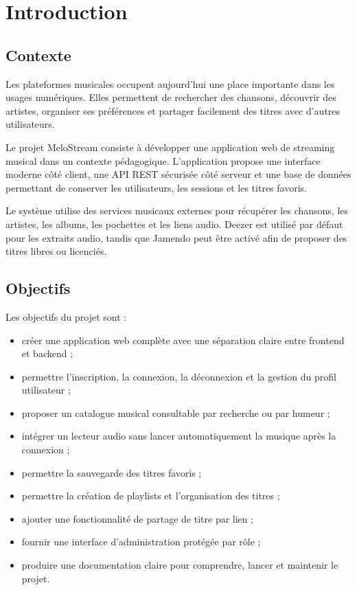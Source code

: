 \documentclass[12pt,a4paper]{report}
\newcommand{\projectName}{MeloStream}
\begin{document}

\chapter*{Introduction}

\section*{Contexte}

Les plateformes musicales occupent aujourd'hui une place importante dans les
usages numériques. Elles permettent de rechercher des chansons, découvrir des
artistes, organiser ses préférences et partager facilement des titres avec
d'autres utilisateurs.

Le projet \projectName{} consiste à développer une application web de streaming
musical dans un contexte pédagogique. L'application propose une interface
moderne côté client, une API REST sécurisée côté serveur et une base de données
permettant de conserver les utilisateurs, les sessions et les titres favoris.

Le système utilise des services musicaux externes pour récupérer les chansons,
les artistes, les albums, les pochettes et les liens audio. Deezer est utilisé
par défaut pour les extraits audio, tandis que Jamendo peut être activé afin de
proposer des titres libres ou licenciés.

\section*{Objectifs}

Les objectifs du projet sont :

\begin{itemize}
    \item créer une application web complète avec une séparation claire entre
    frontend et backend ;
    \item permettre l'inscription, la connexion, la déconnexion et la gestion
    du profil utilisateur ;
    \item proposer un catalogue musical consultable par recherche ou par
    humeur ;
    \item intégrer un lecteur audio sans lancer automatiquement la musique après
    la connexion ;
    \item permettre la sauvegarde des titres favoris ;
    \item permettre la création de playlists et l'organisation des titres ;
    \item ajouter une fonctionnalité de partage de titre par lien ;
    \item fournir une interface d'administration protégée par rôle ;
    \item produire une documentation claire pour comprendre, lancer et maintenir
    le projet.
\end{itemize}
\end{document}
